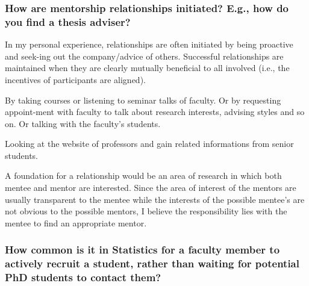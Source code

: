\documentclass{beamer}
\begin{document}
\begin{frame} %
\frametitle{How are mentorship relationships initiated? E.g., how do you find a thesis adviser?}

\medskip

In my personal experience, relationships are often initiated by being proactive and seek-ing  out  the  company/advice  of  others.   Successful  relationships  are  maintained  when they  are  clearly  mutually  beneficial  to  all  involved  (i.e.,  the  incentives  of  participants are aligned).

By taking courses or listening to seminar talks of faculty.  Or by requesting appoint-ment with faculty to talk about research interests, advising styles and so on.  Or talking with the faculty’s students.


Looking at the website of professors and gain related informations from senior students.

A foundation for a relationship would be an area of research in which both mentee and mentor are interested.  Since the area of interest of the mentors are usually transparent to the mentee while the interests of the possible mentee’s are not obvious to the possible mentors, I believe the responsibility lies with the mentee to find an appropriate mentor.






\end{frame}
\begin{frame}
  \frametitle{How common is it in Statistics for a faculty member to actively recruit a student, rather than waiting for potential PhD students to contact them?}
  

\medskip


\end{frame}
\end{document}
